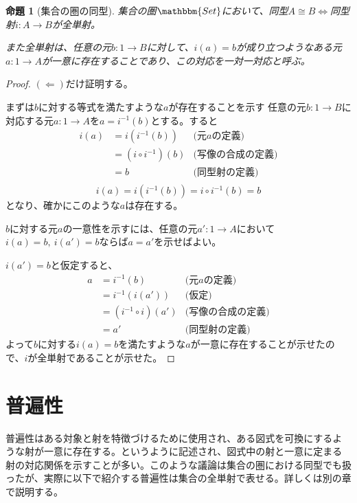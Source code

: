 \documentclass[uplatex,dvipdfmx]{jsarticle}
\newcommand{\cat}[1]{\mathbbm{#1}}
\newcommand{\arrow}{\rightarrow}
\newcommand{\mor}[3]{#1:#2\arrow #3}
\newtheorem{proof}{証明}[section]
\newtheorem{prop}{命題}[section]
\numberwithin{proof}{subsection}
\numberwithin{prop}{subsection}
\numberwithin{define}{subsection}
\begin{document}
	\begin{prop}[集合の圏の同型]
		集合の圏$\cat{Set}$において、同型$A\cong B$$\Longleftrightarrow$同型射$\mor{i}{A}{B}$が全単射。

		また全単射は、任意の元$\mor{b}{1}{B}$に対して、$i(a)=b$が成り立つようなある元$\mor{a}{1}{A}$が一意に存在することであり、この対応を一対一対応と呼ぶ。
	\end{prop}

	\begin{proof}
		$(\Longleftarrow)$だけ証明する。


		まずは$b$に対する等式を満たすような$a$が存在することを示す
		任意の元$\mor{b}{1}{B}$に対応する元$\mor{a}{1}{A}$を$a=i^{-1}(b)$とする。すると
		\begin{align*}
			i(a)&=i(i^{-1}(b))&\text{(元$a$の定義)}\\
			&=(i\circ i^{-1})(b)&\text{(写像の合成の定義)}\\
			&=b&\text{(同型射の定義)}\\
		\end{align*}
		\[i(a)=i(i^{-1}(b))=i\circ i^{-1}(b)=b\]となり、確かにこのような$a$は存在する。

		$b$に対する元$a$の一意性を示すには、任意の元$\mor{a'}{1}{A}$において$i(a)=b,\ i(a')=b$ならば$a=a'$を示せばよい。

		$i(a')=b$と仮定すると、
		\begin{align*}
			a&=i^{-1}(b)&\text{(元$a$の定義)}\\
			&=i^{-1}(i(a'))&\text{(仮定)}\\
			&=(i^{-1}\circ i)(a')&\text{(写像の合成の定義)}\\
			&=a'&\text{(同型射の定義)}
		\end{align*}
		よって$b$に対する$i(a)=b$を満たすような$a$が一意に存在することが示せたので、$i$が全単射であることが示せた。
	\end{proof}

	\section{普遍性}
	普遍性はある対象と射を特徴づけるために使用され、ある図式を可換にするような射が一意に存在する。というように記述され、図式中の射と一意に定まる射の対応関係を示すことが多い。このような議論は集合の圏における同型でも扱ったが、実際に以下で紹介する普遍性は集合の全単射で表せる。詳しくは別の章で説明する。
\end{document}
